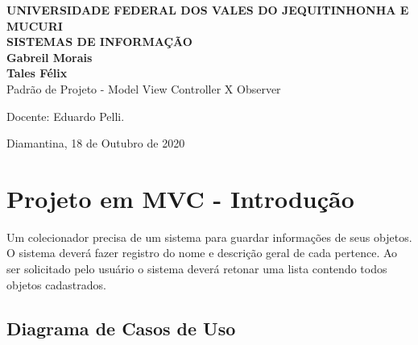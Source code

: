 \documentclass[a4paper]{article}
\begin{document}
  \begin{titlepage}
    \vfill
      \begin{center}
        {\large \textbf{UNIVERSIDADE FEDERAL DOS VALES DO JEQUITINHONHA E MUCURI}} \\[0.5cm]
        {\large \textbf{SISTEMAS DE INFORMAÇÃO}} \\[4cm]
        
        {\large \textbf{Gabreil Morais}}\\[1cm]
        {\large \textbf{Tales Félix}}\\[4cm]
    
        {\Large Padrão de Projeto - Model View Controller  X Observer }\\[4cm]
    
        \hspace{.45\textwidth} %
        \begin{minipage}{.5\textwidth}
        \large
        Docente: Eduardo Pelli.\\[8cm]
    \end{minipage}
    {\large Diamantina, 18 de Outubro de 2020}
    \end{center}
  \end{titlepage}


  \newpage
  
    \section{Projeto em MVC - Introdução}
    Um colecionador precisa de um sistema para guardar informações de seus objetos.
    O sistema deverá fazer registro do nome e descrição geral de cada pertence.
    Ao ser solicitado pelo usuário o sistema deverá retonar uma lista contendo
    todos objetos cadastrados.
    
    
    
    \subsection{Diagrama de Casos de Uso}
\end{document}
